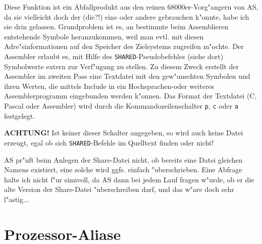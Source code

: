 \documentclass[12pt,a4paper,twoside]{report}
\newcommand{\bb}[1]{{\bf #1}}
\newcommand{\tty}[1]{{\tt #1}}
\begin{document}
Diese Funktion ist ein Abfallprodukt aus den reinen 68000er-Vorg"angern
von AS, da sie vielleicht doch der (die?!) eine oder andere gebrauchen
k"onnte, habe ich sie drin gelassen.  Grundproblem ist es, an bestimmte
beim Assemblieren entstehende Symbole heranzukommen, weil man evtl. mit
diesen Adre"sinformationen auf den Speicher des Zielsystems zugreifen
m"ochte.  Der Assembler erlaubt es, mit Hilfe des \tty{SHARED}-Pseudobefehles
(siehe dort) Symbolwerte extern zur Verf"ugung zu stellen.  Zu diesem
Zweck erstellt der Assembler im zweiten Pass eine Textdatei mit den
gew"unschten Symbolen und ihren Werten, die mittels Include in ein
Hochsprachen-oder weiteres Assemblerprogramm eingebunden werden k"onnen.
Das Format der Textdatei (C, Pascal oder Assembler) wird durch die
Kommandozeilenschalter \tty{p}, \tty{c} oder \tty{a} festgelegt.
\par
\bb{ACHTUNG!} Ist keiner dieser Schalter angegeben, so wird auch keine
Datei erzeugt, egal ob sich \tty{SHARED}-Befehle im Quelltext finden oder
nicht!
\par
AS pr"uft beim Anlegen der Share-Datei nicht, ob bereits eine Datei gleichen
Namens existiert, eine solche wird ggfs. einfach "uberschrieben.  Eine
Abfrage halte ich nicht f"ur sinnvoll, da AS dann bei jedem Lauf fragen
w"urde, ob er die alte Version der Share-Datei "uberschreiben darf, und das
w"are doch sehr l"astig...


\section{Prozessor-Aliase}
\label{SectAlias}
\end{document}
